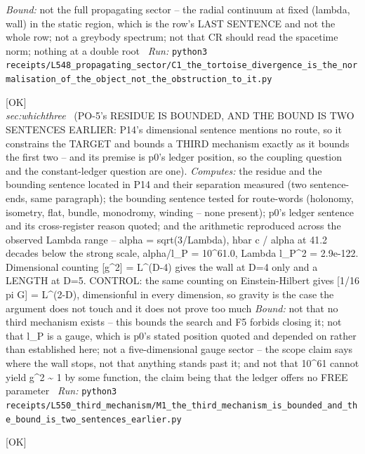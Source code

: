 \begin{description}
 \emph{Bound:} not the full propagating sector -- the radial continuum at fixed (lambda, wall) in the static region, which is the row's LAST SENTENCE and not the whole row; not a greybody spectrum; not that CR should read the spacetime norm; nothing at a double root
\ \emph{Run:} \texttt{python3 receipts/L548\_propagating\_sector/C1\_the\_tortoise\_divergence\_is\_the\_normalisation\_of\_the\_object\_not\_the\_obstruction\_to\_it.py}
\item[\label{rcpt:M1_the_third_mechanism_is_bounded_and_the_bound_is_two_sentences_earlier}\textbf{}\quad\texttt{M1\_the\_third\_mechanism\_is\_bounded\_and\_the\_bound\_is\_two\_sentences\_earlier}]\hfill\textsf{[OK]}\\
\textit{sec:whichthree} \ (PO-5's RESIDUE IS BOUNDED, AND THE BOUND IS TWO SENTENCES EARLIER: P14's dimensional sentence mentions no route, so it constrains the TARGET and bounds a THIRD mechanism exactly as it bounds the first two -- and its premise is p0's ledger position, so the coupling question and the constant-ledger question are one). 
\emph{Computes:} the residue and the bounding sentence located in P14 and their separation measured (two sentence-ends, same paragraph); the bounding sentence tested for route-words (holonomy, isometry, flat, bundle, monodromy, winding -- none present); p0's ledger sentence and its cross-register reason quoted; and the arithmetic reproduced across the observed Lambda range -- alpha = sqrt(3/Lambda), hbar c / alpha at 41.2 decades below the strong scale, alpha/l\_P = 10\textasciicircum{}61.0, Lambda l\_P\textasciicircum{}2 = 2.9e-122. Dimensional counting [g\textasciicircum{}2] = L\textasciicircum{}(D-4) gives the wall at D=4 only and a LENGTH at D=5. CONTROL: the same counting on Einstein-Hilbert gives [1/16 pi G] = L\textasciicircum{}(2-D), dimensionful in every dimension, so gravity is the case the argument does not touch and it does not prove too much
 \emph{Bound:} not that no third mechanism exists -- this bounds the search and F5 forbids closing it; not that l\_P is a gauge, which is p0's stated position quoted and depended on rather than established here; not a five-dimensional gauge sector -- the scope claim says where the wall stops, not that anything stands past it; and not that 10\textasciicircum{}61 cannot yield g\textasciicircum{}2 \textasciitilde{} 1 by some function, the claim being that the ledger offers no FREE parameter
\ \emph{Run:} \texttt{python3 receipts/L550\_third\_mechanism/M1\_the\_third\_mechanism\_is\_bounded\_and\_the\_bound\_is\_two\_sentences\_earlier.py}
\item[\label{rcpt:Y1_the_quantum_theory_carries_a_scale_not_a_coupling_and_a_coupling_set_at_the_substrates_scale_confines_at_or_below_it}\textbf{}\quad\texttt{Y1\_the\_quantum\_theory\_carries\_a\_scale\_not\_a\_coupling\_and\_a\_coupling\_set\_at\_the\_substrates\_scale\_confines\_at\_or\_below\_it}]\hfill\textsf{[OK]}\\

\end{description}
